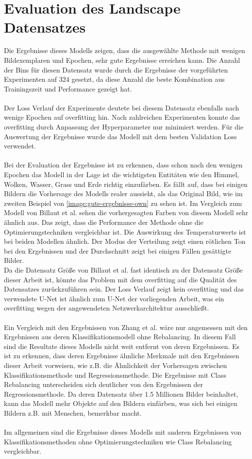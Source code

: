 \section{Evaluation des Landscape Datensatzes}
Die Ergebnisse dieses Modells zeigen, dass die ausgewählte Methode mit wenigen Bildexemplaren und Epochen, sehr gute Ergebnisse erreichen kann.
Die Anzahl der Bins für diesen Datensatz wurde durch die Ergebnisse der vorgeführten Experimenten auf 324 gesetzt, da diese Anzahl die beste Kombination
aus Trainingszeit und Performance gezeigt hat.
\\
\\
Der Loss Verlauf der Experimente deutete bei diesem Datensatz ebenfalls nach wenige Epochen auf \gls{overfitting} hin. Nach zahlreichen Experimenten
konnte das \gls{overfitting} durch Anpassung der Hyperparameter nur minimiert werden. Für die Auswertung der Ergebnisse wurde das Modell mit dem besten
Validation Loss verwendet.
\\
\\
Bei der Evaluation der Ergebnisse ist zu erkennen, dass schon nach den wenigen Epochen das Modell in der Lage ist die wichtigsten Entitäten wie den Himmel, Wolken, Wasser,
Grass und Erde richtig einzufärben. Es fällt auf, dass bei einigen Bildern die Vorhersage des Modells realer aussieht, als das Original Bild,
wie im zweiten Beispiel von \ref{image:gute-ergebnisse-own} zu sehen ist. Im Vergleich zum Modell von Billaut et al. sehen die vorhergesagten
Farben von diesem Modell sehr ähnlich aus. Das zeigt, dass die Performance der Methode ohne die Optimierungstechniken vergleichbar ist.
Die Auswirkung des Temperaturwerts ist bei beiden Modellen ähnlich. Der Modus der Verteilung zeigt einen rötlichen Ton bei den
Ergebnissen und der Durchschnitt zeigt bei einigen Fällen gesättigte Bilder.
\\
Da die Datensatz Größe von Billaut et al. fast identisch zu der Datensatz Größe dieser Arbeit ist, könnte das Problem mit dem \gls{overfitting}
auf die Qualität des Datensatzes zurückzuführen sein. Der Loss Verlauf zeigt kein \gls{overfitting} und das verwendete U-Net ist ähnlich zum
U-Net der vorliegenden Arbeit, was ein \gls{overfitting} wegen der angewendeten Netzwerkarchitektur ausschließt.
\\
\\
Ein Vergleich mit den Ergebnissen von Zhang et al. wäre nur angemessen mit den Ergebnissen aus deren Klassifikationsmodell ohne Rebalancing.
In diesem Fall sind die Resultate dieses Modells nicht weit entfernt von deren Ergebnissen. Es ist zu erkennen, dass deren Ergebnisse ähnliche
Merkmale mit den Ergebnissen dieser Arbeit vorweisen, wie z.B. die Ähnlichkeit der Vorhersagen zwischen Klassifikationsmethode und Regressionsmethode.
Die Ergebnisse mit Class Rebalancing unterscheiden sich deutlicher von den Ergebnissen der Regressionsmethode.
Da deren Datensatz über 1.5 Millionen Bilder beinhaltet, kann das Modell mehr Objekte auf den
Bildern einfärben, was sich bei einigen Bildern z.B. mit Menschen, bemerkbar macht.
\\
\\
Im allgemeinen sind die Ergebnisse dieses Modells mit anderen Ergebnissen von Klassifikationsmethoden ohne Optimierungstechniken wie Class Rebalancing
vergleichbar.